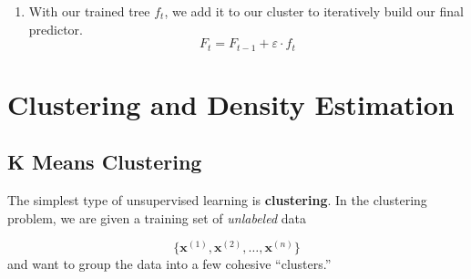 \documentclass{article}
\begin{document}
\begin{definition}
\begin{enumerate}
\begin{enumerate}
                \item With our trained tree $f_t$, we add it to our cluster to iteratively build our final predictor. 
                  \begin{equation}
                    F_t = F_{t-1} + \varepsilon \cdot f_t
                  \end{equation}

              \end{enumerate}
          \end{enumerate}
        \end{definition}


\section{Clustering and Density Estimation} 

  \subsection{K Means Clustering} 

    The simplest type of unsupervised learning is \textbf{clustering}. In the clustering problem, we are given a training set of \textit{unlabeled} data

    \begin{equation}
      \{ \mathbf{x}^{(1)}, \mathbf{x}^{(2)}, \ldots, \mathbf{x}^{(n)}\}
    \end{equation}
    and want to group the data into a few cohesive ``clusters.''
\end{document}
